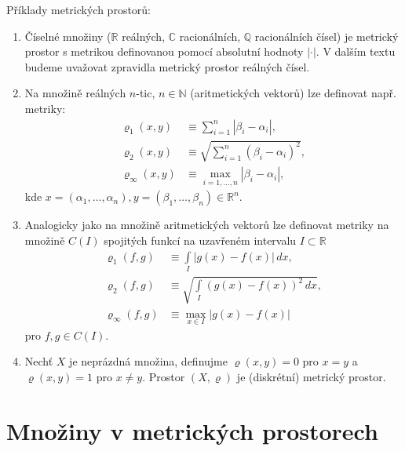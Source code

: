 \begin{ex}
   Příklady metrických prostorů:
   \begin{enumerate}
      \item Číselné množiny ($\mathbb{R}$ reálných, $\mathbb{C}$ racionálních,
            $\mathbb{Q}$ racionálních čísel) je metrický prostor s metrikou 
            definovanou pomocí absolutní hodnoty $|\cdot|$.
            V dalším textu budeme uvažovat zpravidla metrický prostor reálných čísel.
      \item Na množině reálných $n$-tic, $n\in\mathbb{N}$
            (aritmetických vektorů) lze definovat
            např. metriky:
            \[
               \begin{split}
                  \varrho_1(x,y)&\equiv
                           \sum\limits_{i=1}^n|\beta_i-\alpha_i|,\\
                  \varrho_2(x,y)&\equiv
                           \sqrt{\sum\limits_{i=1}^n(\beta_i-\alpha_i)^2},\\
                  \varrho_{\infty}(x,y)&\equiv
                           \max\limits_{i=1,\ldots,n}|\beta_i-\alpha_i|,
               \end{split}
            \]
            kde $x=(\alpha_1,\ldots,\alpha_n),
            y=(\beta_1,\ldots,\beta_n)\in\mathbb{R}^n$.
       \item Analogicky jako na množině aritmetických vektorů
             lze definovat metriky na množině $C(I)$ spojitých funkcí 
             na uzavřeném intervalu $I\subset\mathbb{R}$
            \[
               \begin{split}
                  \varrho_1(f,g)&\equiv
                           \int\limits_I|g(x)-f(x)|\,dx,\\
                  \varrho_2(f,g)&\equiv
                           \sqrt{\int\limits_I(g(x)-f(x))^2\,dx},\\
                  \varrho_{\infty}(f,g)&\equiv
                           \max\limits_{x\in I}|g(x)-f(x)|
               \end{split}
            \]
            pro $f,g\in C(I)$.
        \item Nechť $X$ je neprázdná množina, definujme
              $\varrho(x,y)=0$ pro $x=y$ a $\varrho(x,y)=1$ pro $x\neq y$.
              Prostor $(X,\varrho)$ je (diskrétní) metrický prostor.
   \end{enumerate}
\end{ex}

\section{Množiny v metrických prostorech}

